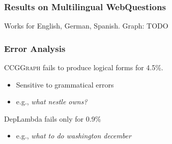 \documentclass[mathserif,12pt]{beamer}
\newcommand \ccggraph{\textsc{CCGGraph}\xspace}
\begin{document}
\begin{frame}
\end{frame}

\begin{frame}
\frametitle{Results on Multilingual WebQuestions}
\huge Works for English, German, Spanish. Graph: TODO
\end{frame}

\begin{frame}
\frametitle{Error Analysis}
\large
 \ccggraph fails to produce logical forms for 4.5\%.
 \begin{itemize}
  \item Sensitive to grammatical errors
  \item e.g., \textsl{what nestle owns?}
 \end{itemize}  
 
 \vspace{2em}
 DepLambda fails only for 0.9\%
 \begin{itemize}
   \item e.g., \textsl{what to do washington december}
 \end{itemize}  
\end{frame}
\end{document}
